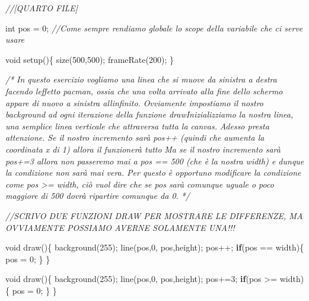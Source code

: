 \documentclass[
]{article}
\newenvironment{Shaded}{}{}
\newcommand{\CommentTok}[1]{\textcolor[rgb]{0.38,0.63,0.69}{\textit{#1}}}
\newcommand{\ControlFlowTok}[1]{\textcolor[rgb]{0.00,0.44,0.13}{\textbf{#1}}}
\newcommand{\DataTypeTok}[1]{\textcolor[rgb]{0.56,0.13,0.00}{#1}}
\newcommand{\DecValTok}[1]{\textcolor[rgb]{0.25,0.63,0.44}{#1}}
\newcommand{\FunctionTok}[1]{\textcolor[rgb]{0.02,0.16,0.49}{#1}}
\newcommand{\NormalTok}[1]{#1}
\newcommand{\OperatorTok}[1]{\textcolor[rgb]{0.40,0.40,0.40}{#1}}
\begin{document}
\begin{Shaded}
\begin{Highlighting}[]
\CommentTok{//[QUARTO FILE]}

\DataTypeTok{int}\NormalTok{ pos }\OperatorTok{=} \DecValTok{0}\OperatorTok{;} \CommentTok{//Come sempre rendiamo globale lo scope della variabile che ci serve usare}

\DataTypeTok{void} \FunctionTok{setup}\OperatorTok{()\{}
  \FunctionTok{size}\OperatorTok{(}\DecValTok{500}\OperatorTok{,}\DecValTok{500}\OperatorTok{);}
  \FunctionTok{frameRate}\OperatorTok{(}\DecValTok{200}\OperatorTok{);}
\OperatorTok{\}}

\CommentTok{/*}
\CommentTok{In questo esercizio vogliamo una linea che si muove da sinistra a destra facendo l\textquotesingle{}effetto pacman, ossia che una volta arrivato alla fine dello schermo appare di nuovo a sinistra all\textquotesingle{}infinito.}
\CommentTok{Ovviamente impostiamo il nostro background ad ogni iterazione della funzione drawInizializziamo la nostra linea, una semplice linea verticale che attraversa tutta la canvas.}
\CommentTok{Adesso presta attenzione.}
\CommentTok{Se il nostro incremento sarà pos++ (quindi che aumenta la coordinata x di 1) allora il funzionerà tutto}
\CommentTok{Ma se il nostro incremento sarà pos+=3 allora non passeremo mai a pos == 500 (che è la nostra width) e dunque la condizione non sarà mai vera. Per questo è opportuno modificare la condizione come pos \textgreater{}= width, ciò vuol dire che se pos sarà comunque uguale o poco maggiore di 500 dovrà ripartire comunque da 0.}
\CommentTok{*/}

\CommentTok{//SCRIVO DUE FUNZIONI DRAW PER MOSTRARE LE DIFFERENZE, MA OVVIAMENTE POSSIAMO AVERNE SOLAMENTE UNA!!!}

\DataTypeTok{void} \FunctionTok{draw}\OperatorTok{()\{}
  \FunctionTok{background}\OperatorTok{(}\DecValTok{255}\OperatorTok{);}
  \FunctionTok{line}\OperatorTok{(}\NormalTok{pos}\OperatorTok{,}\DecValTok{0}\OperatorTok{,}\NormalTok{ pos}\OperatorTok{,}\NormalTok{height}\OperatorTok{);}
\NormalTok{  pos}\OperatorTok{++;}
  \ControlFlowTok{if}\OperatorTok{(}\NormalTok{pos }\OperatorTok{==}\NormalTok{ width}\OperatorTok{)\{}
\NormalTok{    pos }\OperatorTok{=} \DecValTok{0}\OperatorTok{;}
  \OperatorTok{\}}
\OperatorTok{\}}

\DataTypeTok{void} \FunctionTok{draw}\OperatorTok{()\{}
  \FunctionTok{background}\OperatorTok{(}\DecValTok{255}\OperatorTok{);}
  \FunctionTok{line}\OperatorTok{(}\NormalTok{pos}\OperatorTok{,}\DecValTok{0}\OperatorTok{,}\NormalTok{ pos}\OperatorTok{,}\NormalTok{height}\OperatorTok{);}
\NormalTok{  pos}\OperatorTok{+=}\DecValTok{3}\OperatorTok{;}
  \ControlFlowTok{if}\OperatorTok{(}\NormalTok{pos }\OperatorTok{\textgreater{}=}\NormalTok{ width}\OperatorTok{)\{}
\NormalTok{    pos }\OperatorTok{=} \DecValTok{0}\OperatorTok{;}
  \OperatorTok{\}}
\OperatorTok{\}}
\end{Highlighting}
\end{Shaded}
\end{document}
